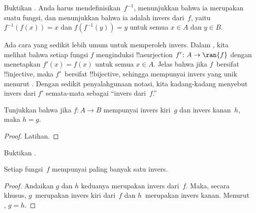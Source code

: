 \documentclass[../../../include/open-logic-section]{subfiles}
\begin{document}
\begin{prob}
Buktikan . Anda harus
mendefinisikan~$f^{-1}$, menunjukkan bahwa ia merupakan suatu fungsi, dan
menunjukkan bahwa ia adalah invers dari~$f$, yaitu $f^{-1}(f(x)) = x$ dan
$f(f^{-1}(y)) = y$ untuk semua $x \in A$ dan $y \in B$.
\end{prob}

\begin{explain}
Ada cara yang sedikit lebih umum untuk memperoleh invers. Dalam
, kita melihat bahwa setiap fungsi $f$ menginduksi
!!a{surjection} $f' \colon A \to \ran{f}$ dengan menetapkan $f'(x) = f(x)$
untuk semua $x \in A$. Jelas bahwa jika $f$~bersifat !!{injective}, maka
$f'$~bersifat !!{bijective}, sehingga mempunyai invers yang unik menurut
. Dengan sedikit penyalahgunaan notasi, kita
kadang-kadang menyebut invers dari $f'$ semata-mata sebagai ``invers dari~$f$.''
\end{explain}

\begin{prop}%
  Tunjukkan bahwa jika $f\colon A \to B$ mempunyai invers kiri~$g$ dan invers
  kanan~$h$, maka $h = g$.
\end{prop}

\begin{proof}
  Latihan.
\end{proof}

\begin{prob}
  Buktikan .
\end{prob}

\begin{prop}
Setiap fungsi~$f$ mempunyai paling banyak satu invers.
\end{prop}

\begin{proof}
  Andaikan $g$ dan $h$ keduanya merupakan invers dari~$f$. Maka, secara
  khusus, $g$~merupakan invers kiri dari~$f$ dan $h$~merupakan invers kanan.
  Menurut , $g = h$.
\end{proof}
\end{document}
